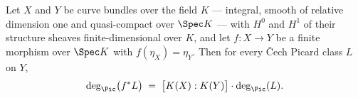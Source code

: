 \begin{theorem}
  \label{thm:classDeg_cechPicMap_eq_finrank_mul}
  \leanok
  Let \(X\) and \(Y\) be curve bundles over the field \(K\) --- integral, smooth of
  relative dimension one and quasi-compact over \(\Spec K\) --- with \(H^0\) and
  \(H^1\) of their structure sheaves finite-dimensional over \(K\), and let
  \(f : X \to Y\) be a finite morphism over \(\Spec K\) with \(f(\eta_X) = \eta_Y\).
  Then for every \v Cech Picard class \(L\) on \(Y\),
  \[
    \deg_{\Pic}\bigl(f^{*}L\bigr)
      \;=\; \bigl[K(X) : K(Y)\bigr] \cdot \deg_{\Pic}(L).
  \]
\end{theorem}
